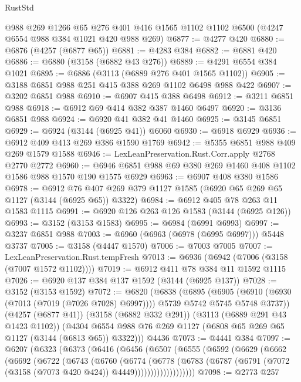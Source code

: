 \begin{lexlean}{RustStd}
\begin{coremodule}
    @988
    @269
    @1266
    @65
    @276
    @401
    @416
    @1565
    @1102
    @1102
    @6500
    (@4247 @6554 @988 @384 @1021 @420 @988 @269)
@6877 := @4277 @420
@6880 := @6876 (@4257 (@6877 @65))
@6881 := @4283 @384
@6882 := @6881 @420
@6886 := @6880 (@3158 (@6882 @43 @276))
@6889 := @4291 @6554 @384 @1021
@6895 := @6886 (@3113 (@6889 @276 @401 @1565 @1102))
@6905 := @3188 @6851 @988 @251 @415 @388 @269 @1102 @6498 @988 @422
@6907 := @3202 @6851 @988
@6910 := @6907 @415 @388 @6498
@6912 := @3211 @6851 @988
@6918 := @6912 @69 @414 @382 @387 @1460 @6497
@6920 := @3136 @6851 @988
@6924 := @6920 @41 @382 @41 @1460
@6925 := @3145 @6851
@6929 := @6924 (@3144 (@6925 @41)) @6060
@6930 := @6918 @6929
@6936 := @6912 @409 @413 @269 @386 @1590 @1769
@6942 := @5355 @6851 @988 @409 @269 @1579 @1588
@6946 := LexLeanPreservation.Rust.Corr.apply @2768 @2770 @2772
@6960 := @6946 @6851 @988 @69 @380 @269 @1460 @408 @1102 @1586 @988 @1570 @190 @1575 @6929
@6963 := @6907 @408 @380 @1586
@6978 := @6912 @76 @407 @269 @379 @1127 @1585 (@6920 @65 @269 @65 @1127 (@3144 (@6925 @65)) @3322)
@6984 := @6912 @405 @78 @263 @11 @1583 @1115
@6991 := @6920 @126 @263 @126 @1583 (@3144 (@6925 @126))
@6993 := @3152 (@3153 @1583)
@6995 := @6984 (@6991 @6993)
@6997 := @3237 @6851 @988
@7003 := @6960 (@6963 (@6978 (@6995 @6997))) @5448 @3737
@7005 := @3158 (@4447 @1570)
@7006 := @7003 @7005
@7007 := LexLeanPreservation.Rust.tempFresh
@7013 := @6936 (@6942 (@7006 (@3158 (@7007 @1572 @1102))))
@7019 := @6912 @411 @78 @384 @11 @1592 @1115
@7026 := @6920 @137 @384 @137 @1592 (@3144 (@6925 @137))
@7028 := @3152 (@3153 @1592)
@7072 := @6820
    (@6838
      (@6895
        (@6905 (@6910 (@6930 (@7013 (@7019 (@7026 @7028) @6997)))) @5739 @5742 @5745 @5748 @3737))
      (@4257 (@6877 @41))
      (@3158 (@6882 @332 @291))
      (@3113 (@6889 @291 @43 @1423 @1102))
      (@4304 @6554 @988 @76 @269 @1127 (@6808 @65 @269 @65 @1127 (@3144 (@6813 @65)) @3322)))
    @4436
@7073 := @4441 @384
@7097 := @6207
    (@6323
      (@6373
        (@6416
          (@6456
            (@6507
              (@6555
                (@6592
                  (@6629
                    (@6662
                      (@6692
                        (@6722
                          (@6743
                            (@6760
                              (@6774
                                (@6778
                                  (@6783
                                    (@6787
                                      (@6791
                                        (@7072 (@3158 (@7073 @420 @424)) @4449)))))))))))))))))))
@7098 := @2773 @257

\end{coremodule}
\end{lexlean}
